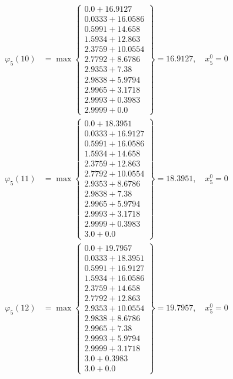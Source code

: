 \documentclass{article}
\begin{document}
\begin{align*}
  
  
  
\varphi_{5}(10) &= \max \left\{ \begin{array}{c}
0.0 + 16.9127 \\
 0.0333 + 16.0586 \\
 0.5991 + 14.658 \\
 1.5934 + 12.863 \\
 2.3759 + 10.0554 \\
 2.7792 + 8.6786 \\
 2.9353 + 7.38 \\
 2.9838 + 5.9794 \\
 2.9965 + 3.1718 \\
 2.9993 + 0.3983 \\
 2.9999 + 0.0
\end{array} \right\}=16.9127,\quad x_{5}^0=0\\
  
  
  
  
\varphi_{5}(11) &= \max \left\{ \begin{array}{c}
0.0 + 18.3951 \\
 0.0333 + 16.9127 \\
 0.5991 + 16.0586 \\
 1.5934 + 14.658 \\
 2.3759 + 12.863 \\
 2.7792 + 10.0554 \\
 2.9353 + 8.6786 \\
 2.9838 + 7.38 \\
 2.9965 + 5.9794 \\
 2.9993 + 3.1718 \\
 2.9999 + 0.3983 \\
 3.0 + 0.0
\end{array} \right\}=18.3951,\quad x_{5}^0=0\\
  
  
  
  
\varphi_{5}(12) &= \max \left\{ \begin{array}{c}
0.0 + 19.7957 \\
 0.0333 + 18.3951 \\
 0.5991 + 16.9127 \\
 1.5934 + 16.0586 \\
 2.3759 + 14.658 \\
 2.7792 + 12.863 \\
 2.9353 + 10.0554 \\
 2.9838 + 8.6786 \\
 2.9965 + 7.38 \\
 2.9993 + 5.9794 \\
 2.9999 + 3.1718 \\
 3.0 + 0.3983 \\
 3.0 + 0.0
\end{array} \right\}=19.7957,\quad x_{5}^0=0\\
  

\end{align*}
\end{document}
